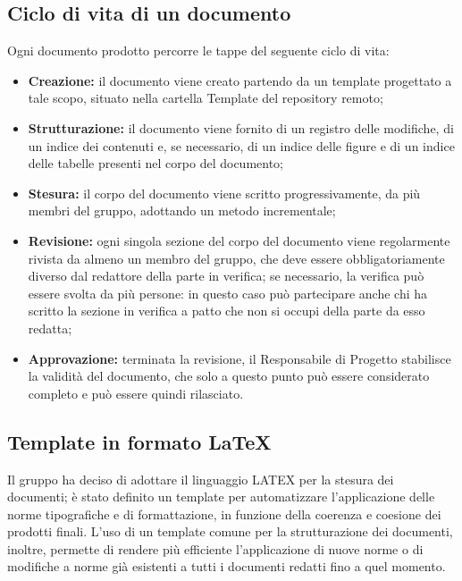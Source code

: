\subsection{Ciclo di vita di un documento}
Ogni documento prodotto percorre le tappe del seguente ciclo di vita:
\begin{itemize}
\item \textbf{Creazione:} il documento viene creato partendo da un template progettato a tale
	scopo, situato nella cartella Template del repository remoto;
	\item \textbf{Strutturazione:} il documento viene fornito di un registro delle modifiche, di un indice dei   contenuti e, se necessario, di un indice delle figure e di un indice delle tabelle presenti nel corpo del documento;
		\item \textbf{Stesura:} il corpo del documento viene scritto progressivamente, da più membri del gruppo, adottando un metodo incrementale;
			\item \textbf{Revisione:} ogni singola sezione del corpo del documento viene regolarmente rivista da almeno un membro del gruppo, che deve essere obbligatoriamente diverso dal redattore della parte in verifica; se necessario, la verifica può essere svolta da più persone: in questo caso può partecipare anche chi ha scritto la sezione in verifica a patto che non si occupi della parte da esso redatta;
				\item \textbf{Approvazione:} terminata la revisione, il Responsabile di Progetto stabilisce la validità del documento, che solo a questo punto può essere considerato completo e può essere quindi rilasciato.
\end{itemize} 
\subsection{Template in formato \LaTeX}
Il gruppo ha deciso di adottare il linguaggio LATEX per la stesura dei documenti; è stato definito un template per automatizzare l’applicazione delle norme tipografiche e di formattazione, in funzione della coerenza e coesione dei prodotti finali.
L’uso di un template comune per la strutturazione dei documenti, inoltre, permette di rendere più efficiente l’applicazione di nuove norme o di modifiche a norme già esistenti a tutti i documenti redatti fino a quel momento.
